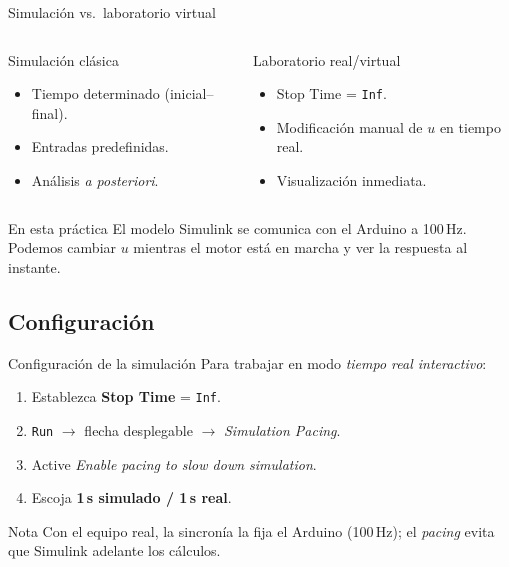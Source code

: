 \documentclass{beamer}
\begin{document}
\begin{frame}{Simulación vs.\ laboratorio virtual}
\begin{columns}[T]
  \begin{block}{Simulación clásica}
    \begin{itemize}
      \item Tiempo determinado (inicial--final).
      \item Entradas predefinidas.
      \item Análisis \emph{a posteriori}.
    \end{itemize}
  \end{block}
  \begin{block}{Laboratorio real/virtual}
    \begin{itemize}
      \item Stop Time = \texttt{Inf}.
      \item Modificación manual de $u$ en tiempo real.
      \item Visualización inmediata.
    \end{itemize}
  \end{block}
\end{columns}
\vspace{8pt}
\begin{alertblock}{En esta práctica}
  El modelo Simulink se comunica con el Arduino a 100\,Hz.
  Podemos cambiar $u$ mientras el motor está en marcha y ver la respuesta
  al instante.
\end{alertblock}
\end{frame}

\subsection{Configuración}

\begin{frame}{Configuración de la simulación}
Para trabajar en modo \emph{tiempo real interactivo}:
\begin{enumerate}
  \item Establezca \textbf{Stop Time} = \texttt{Inf}.
  \item \texttt{Run} $\to$ flecha desplegable $\to$ \emph{Simulation Pacing}.
  \item Active \emph{Enable pacing to slow down simulation}.
  \item Escoja \textbf{1\,s simulado / 1\,s real}.
\end{enumerate}
\begin{block}{Nota}
  Con el equipo real, la sincronía la fija el Arduino (100\,Hz); el
  \emph{pacing} evita que Simulink adelante los cálculos.
\end{block}
\end{frame}
\end{document}
